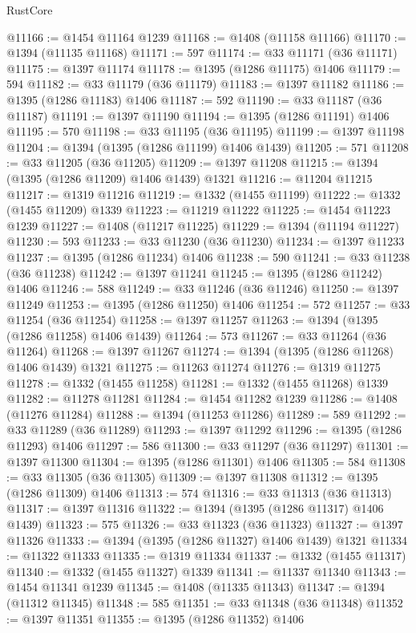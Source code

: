 \begin{lexlean}{RustCore}
\begin{coremodule}
@11166 := @1454 @11164 @1239
@11168 := @1408 (@11158 @11166)
@11170 := @1394 (@11135 @11168)
@11171 := 597
@11174 := @33 @11171 (@36 @11171)
@11175 := @1397 @11174
@11178 := @1395 (@1286 @11175) @1406
@11179 := 594
@11182 := @33 @11179 (@36 @11179)
@11183 := @1397 @11182
@11186 := @1395 (@1286 @11183) @1406
@11187 := 592
@11190 := @33 @11187 (@36 @11187)
@11191 := @1397 @11190
@11194 := @1395 (@1286 @11191) @1406
@11195 := 570
@11198 := @33 @11195 (@36 @11195)
@11199 := @1397 @11198
@11204 := @1394 (@1395 (@1286 @11199) @1406 @1439)
@11205 := 571
@11208 := @33 @11205 (@36 @11205)
@11209 := @1397 @11208
@11215 := @1394 (@1395 (@1286 @11209) @1406 @1439) @1321
@11216 := @11204 @11215
@11217 := @1319 @11216
@11219 := @1332 (@1455 @11199)
@11222 := @1332 (@1455 @11209) @1339
@11223 := @11219 @11222
@11225 := @1454 @11223 @1239
@11227 := @1408 (@11217 @11225)
@11229 := @1394 (@11194 @11227)
@11230 := 593
@11233 := @33 @11230 (@36 @11230)
@11234 := @1397 @11233
@11237 := @1395 (@1286 @11234) @1406
@11238 := 590
@11241 := @33 @11238 (@36 @11238)
@11242 := @1397 @11241
@11245 := @1395 (@1286 @11242) @1406
@11246 := 588
@11249 := @33 @11246 (@36 @11246)
@11250 := @1397 @11249
@11253 := @1395 (@1286 @11250) @1406
@11254 := 572
@11257 := @33 @11254 (@36 @11254)
@11258 := @1397 @11257
@11263 := @1394 (@1395 (@1286 @11258) @1406 @1439)
@11264 := 573
@11267 := @33 @11264 (@36 @11264)
@11268 := @1397 @11267
@11274 := @1394 (@1395 (@1286 @11268) @1406 @1439) @1321
@11275 := @11263 @11274
@11276 := @1319 @11275
@11278 := @1332 (@1455 @11258)
@11281 := @1332 (@1455 @11268) @1339
@11282 := @11278 @11281
@11284 := @1454 @11282 @1239
@11286 := @1408 (@11276 @11284)
@11288 := @1394 (@11253 @11286)
@11289 := 589
@11292 := @33 @11289 (@36 @11289)
@11293 := @1397 @11292
@11296 := @1395 (@1286 @11293) @1406
@11297 := 586
@11300 := @33 @11297 (@36 @11297)
@11301 := @1397 @11300
@11304 := @1395 (@1286 @11301) @1406
@11305 := 584
@11308 := @33 @11305 (@36 @11305)
@11309 := @1397 @11308
@11312 := @1395 (@1286 @11309) @1406
@11313 := 574
@11316 := @33 @11313 (@36 @11313)
@11317 := @1397 @11316
@11322 := @1394 (@1395 (@1286 @11317) @1406 @1439)
@11323 := 575
@11326 := @33 @11323 (@36 @11323)
@11327 := @1397 @11326
@11333 := @1394 (@1395 (@1286 @11327) @1406 @1439) @1321
@11334 := @11322 @11333
@11335 := @1319 @11334
@11337 := @1332 (@1455 @11317)
@11340 := @1332 (@1455 @11327) @1339
@11341 := @11337 @11340
@11343 := @1454 @11341 @1239
@11345 := @1408 (@11335 @11343)
@11347 := @1394 (@11312 @11345)
@11348 := 585
@11351 := @33 @11348 (@36 @11348)
@11352 := @1397 @11351
@11355 := @1395 (@1286 @11352) @1406

\end{coremodule}
\end{lexlean}
